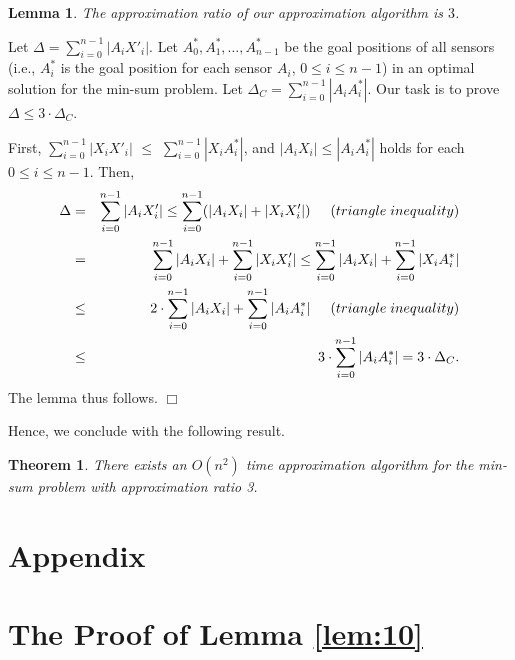 \documentclass[11pt]{article}
\newenvironment{proof}{\noindent {\textbf{Proof:}}\rm}{\hfill $\Box$
\rm}
\newtheorem{Theo}{Theorem}
\newtheorem{Lem}{Lemma}
\begin{document}
\begin{Lem}\label{lem:40}
The approximation ratio of our approximation algorithm is $3$.
\end{Lem}
\begin{proof}
Let $\Delta = \sum_{i=0}^{n-1} |A_{i} X'_{i}|$. Let
$A^{\ast}_0,A^{\ast}_1,\ldots, A^{\ast}_{n-1}$ be the goal positions
of all sensors (i.e., $A^*_i$ is the goal position for each sensor
$A_i$, $0\leq i\leq n-1$) in an optimal solution for the
min-sum problem. Let $\Delta_C =\sum_{i=0}^{n-1} |A_{i} A^*_{i}|$.
Our task is to prove $\Delta\leq 3\cdot \Delta_C$.

First, \( \sum_{i=0}^{n-1} |X_{i} X'_{i}| \) $\leq$ \(
\sum_{i=0}^{n-1} |X_{i} A^{\ast}_{i}| \), and $|A_i X_i| \leq |A_i
A^{\ast}_i|$ holds for each $0 \leq i \leq n-1$. Then,
\begin{eqnarray*}
\Delta  & =    & \sum_{i=0}^{n-1} |A_{i} X'_{i}| \leq \sum_{i=0}^{n-1} (|A_{i} X_{i}| + |X_i X'_{i}|) \hspace{0.5cm} (triangle \; inequality) \\
        & =    & \sum_{i=0}^{n-1} |A_{i} X_{i}| + \sum_{i=0}^{n-1} |X_{i} X'_{i}| \leq \sum_{i=0}^{n-1} |A_{i} X_{i}| + \sum_{i=0}^{n-1} |X_{i} A^{\ast}_{i}| \\
        & \leq & 2 \cdot \sum_{i=0}^{n-1} |A_{i} X_{i}| + \sum_{i=0}^{n-1} |A_{i} A^{\ast}_{i}| \hspace{0.5cm} (triangle \; inequality) \\
        & \leq & 3 \cdot \sum_{i=0}^{n-1} |A_{i} A^{\ast}_{i}| =  3 \cdot \Delta_C.
\end{eqnarray*}
The lemma thus follows.
\end{proof}

Hence, we conclude with the following result.

\begin{Theo}
There exists an $O(n^2)$ time approximation algorithm for the
min-sum problem with approximation ratio 3.
\end{Theo}



\footnotesize
\baselineskip=11.0pt



\newpage
\normalsize
\appendix
\section*{Appendix}

\section{The Proof of Lemma \ref{lem:10}}
\label{app:lemmaproofs}
\end{document}
